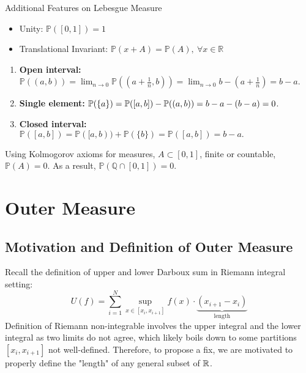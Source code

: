 \begin{prop}{Additional Features on Lebesgue Measure}
\begin{itemize}
        \item Unity: $\mathbb{P}([0, 1]) = 1$ 
    	\item Translational Invariant: $\mathbb{P}(x + A) = \mathbb{P}(A), \ \forall x \in \mathbb{R}$
\end{itemize}
\end{prop}


\begin{prop}{}
\begin{enumerate}
    \item \textbf{Open interval: } \(\mathbb{P}((a,b)) = \lim_{n \to 0} \mathbb{P}((a+\frac{1}{n},b)) = \lim_{n \to 0} b-(a+\frac{1}{n}) = b-a\).
    \item \textbf{Single element: } \(\mathbb{P}(\qty{a}) = \mathbb{P}([a,b]) - \mathbb{P}((a,b)) = b-a - (b-a) = 0 \).
    \item \textbf{Closed interval: } \(\mathbb{P}([a,b]) = \mathbb{P}([a,b)) + \mathbb{P}(\{b\}) = \mathbb{P}([a,b]) = b - a.\)
\end{enumerate}
\end{prop}

\begin{rmk}
Using Kolmogorov axioms for measures, \(A \subset [0,1]\), finite or countable, \(\mathbb{P}(A) = 0\).
As a result, \(\mathbb{P}(\mathbb{Q} \cap [0,1]) = 0.\)
\end{rmk}


\newpage
\section*{Outer Measure}
\subsection*{Motivation and Definition of Outer Measure}
Recall the definition of upper and lower Darboux sum in Riemann integral setting: 
$$U(f) = \sum_{i=1}^N \sup_{x\in [x_i, x_{i+1}]}{f(x)} \cdot \underbrace{(x_{i+1} - x_i)}_{\text{length}}$$
Definition of Riemann non-integrable involves the upper integral and the lower integral as two limits do not agree, which likely boils down to some partitions $[x_i, x_{i+1}]$ not well-defined. Therefore, to propose a fix, we are motivated to properly define the "length" of any general subset of ${\mathbb{R}}$. \\

